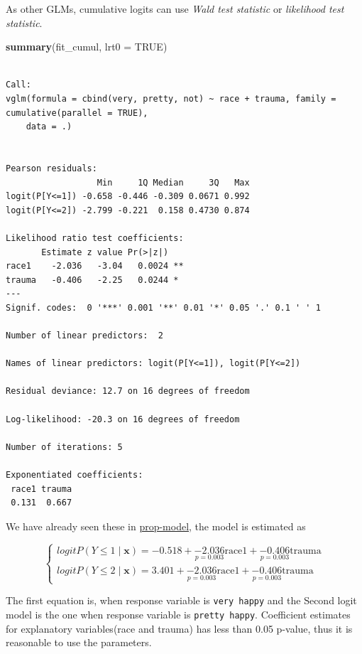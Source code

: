 \documentclass[]{book}
\newenvironment{Shaded}{\begin{snugshade}}{\end{snugshade}}
\newcommand{\DataTypeTok}[1]{\textcolor[rgb]{0.13,0.29,0.53}{#1}}
\newcommand{\KeywordTok}[1]{\textcolor[rgb]{0.13,0.29,0.53}{\textbf{#1}}}
\newcommand{\NormalTok}[1]{#1}
\newcommand{\OtherTok}[1]{\textcolor[rgb]{0.56,0.35,0.01}{#1}}
\begin{document}
As other GLMs, cumulative logits can use \emph{Wald test statistic} or \emph{likelihood test statistic}.

\begin{Shaded}
\begin{Highlighting}[]
\KeywordTok{summary}\NormalTok{(fit_cumul, }\DataTypeTok{lrt0 =} \OtherTok{TRUE}\NormalTok{)}
\end{Highlighting}
\end{Shaded}

\begin{verbatim}

Call:
vglm(formula = cbind(very, pretty, not) ~ race + trauma, family = cumulative(parallel = TRUE), 
    data = .)


Pearson residuals:
                  Min     1Q Median     3Q   Max
logit(P[Y<=1]) -0.658 -0.446 -0.309 0.0671 0.992
logit(P[Y<=2]) -2.799 -0.221  0.158 0.4730 0.874

Likelihood ratio test coefficients: 
       Estimate z value Pr(>|z|)   
race1    -2.036   -3.04   0.0024 **
trauma   -0.406   -2.25   0.0244 * 
---
Signif. codes:  0 '***' 0.001 '**' 0.01 '*' 0.05 '.' 0.1 ' ' 1

Number of linear predictors:  2 

Names of linear predictors: logit(P[Y<=1]), logit(P[Y<=2])

Residual deviance: 12.7 on 16 degrees of freedom

Log-likelihood: -20.3 on 16 degrees of freedom

Number of iterations: 5 

Exponentiated coefficients:
 race1 trauma 
 0.131  0.667 
\end{verbatim}

We have already seen these in \protect\hyperlink{prop-model}{prop-model}, the model is estimated as

\[
\begin{cases}
logit P(Y \le 1 \mid \mathbf{x}) = -0.518 + \underset{p = 0.003}{-2.036} \text{race1} + \underset{p = 0.003}{-0.406} \text{trauma} \\
logit P(Y \le 2 \mid \mathbf{x}) = 3.401 + \underset{p = 0.003}{-2.036} \text{race1} + \underset{p = 0.003}{-0.406} \text{trauma}
\end{cases}
\]

The first equation is, when response variable is \texttt{very\ happy} and the Second logit model is the one when response variable is \texttt{pretty\ happy}. Coefficient estimates for explanatory variables(race and trauma) has less than 0.05 p-value, thus it is reasonable to use the parameters.
\end{document}
